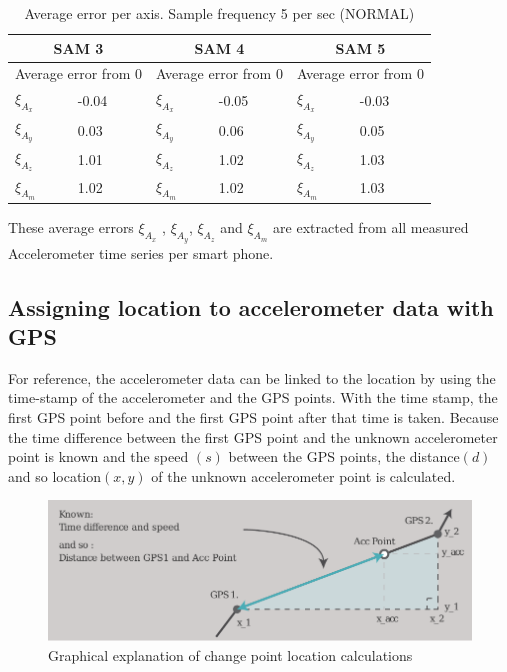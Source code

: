 \renewcommand{\arraystretch}{1.5}
\renewcommand{\tabcolsep}{0.2cm}
\begin{table}[h]
\centering
\caption{Average error per axis. Sample frequency 5 per sec (NORMAL)}
\label{averageerror}
\begin{tabular}{|p{56.6pt}|p{56.6pt}|p{56.6pt}|p{56.6pt}|p{56.6pt}|p{56.6pt}|} 
\hline
\multicolumn{2}{|c|}{SAM 3} & \multicolumn{2}{|c|}{SAM 4} & \multicolumn{2}{|c|}{SAM 5} \\
\hline
\multicolumn{2}{|c|}{Average error from 0} & \multicolumn{2}{|c|}{Average error from 0} & \multicolumn{2}{|c|}{Average error from 0} \\ 
\hline
$\xi_{A_x}$ & -0.04 &$\xi_{A_x}$ & -0.05 &$\xi_{A_x}$ & -0.03 \\
$\xi_{A_y}$ & 0.03 & $\xi_{A_y}$ & 0.06 & $\xi_{A_y}$ & 0.05 \\
$\xi_{A_z}$ & 1.01 & $\xi_{A_z}$ & 1.02 & $\xi_{A_z}$ & 1.03 \\
$\xi_{A_m}$ & 1.02 & $\xi_{A_m}$ & 1.02 & $\xi_{A_m}$ & 1.03 \\
\hline
\end{tabular}
\end{table}

These average errors $\xi_{A_x}$ , $\xi_{A_y}$, $\xi_{A_z}$ and $\xi_{A_m}$ are extracted from all measured Accelerometer time series per smart phone. 

\subsection{Assigning location to accelerometer data with GPS}
For reference, the accelerometer data can be linked to the location by using the time-stamp of the accelerometer and the GPS points. With the time stamp, the first GPS point before and the first GPS point after that time is taken. Because the time difference between the first GPS point and the unknown accelerometer point is known and the speed $(s)$ between the GPS points, the distance$(d)$ and so location$(x,y)$ of the unknown accelerometer point is calculated. 

\begin{figure}[H]
\includegraphics[width=\textwidth]{img/M_location_calc.pdf}
\centering
\caption{Graphical explanation of change point location calculations \label{cpcalc}}
\end{figure}

